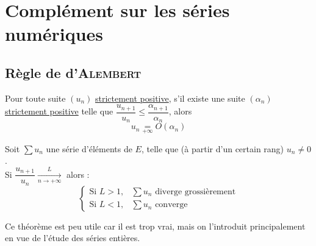\documentclass[11pt,a4paper,fleqn,pdftex]{report}
\begin{document}
\section{Complément sur les séries numériques} %
\label{sec:complement_sur_les_series_numeriques}
\subsection{Règle de d'\textsc{Alembert}} %
\label{sub:regle_de_d_alembert}
\begin{lemme}
    Pour toute suite $(u_n)$ \uline{strictement positive}, s'il existe une suite $(\alpha_n)$ \uline{strictement positive} telle que $\dfrac{u_{n+1}}{u_n}\le \dfrac{\alpha_{n+1}}{\alpha_n}$, alors 
    \begin{equation}
    u_n \underset{+\infty}{=} O(\alpha_n)
    \end{equation}
\end{lemme}
\begin{itheorem}\label{th:Regle_de_dAlembert}
    Soit $\sum u_n$ une série d'éléments de $E$, telle que (à partir d'un certain rang) $u_n \neq 0$.\\
    Si $\dfrac{u_{n+1}}{u_n} \xrightarrow[n\to +\infty] L$ alors :
    \begin{equation}
    \left\lbrace
    \begin{aligned}
        \text{Si } L >1, & \sum u_n \text{ diverge grossièrement}   \\
        \text{Si } L <1, & \sum u_n \text{ converge} 
    \end{aligned}
    \right.
    \end{equation}
\end{itheorem}
Ce théorème est peu utile car il est \og{}trop vrai\fg{}, mais on l'introduit principalement en vue de l'étude des séries entières.
\end{document}
